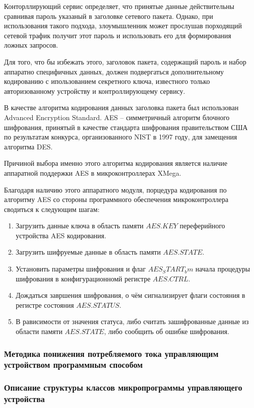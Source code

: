 Конторллирующий сервис определяет, что принятые данные действительны
сравнивая пароль указаный в заголовке сетевого пакета. Однако,
при использования такого подхода, злоумышленник может прослушав
порходящий сетевой трафик получит этот пароль и использовать его
для формирования ложных запросов.


Для того, что бы избежать этого, заголовок пакета, содержащий пароль
и набор аппаратно специфичных данных, должен подвергаться дополнительному
кодированию с ипользованием секретного ключа, известного только
авторизованному устройству и контроллирующему сервису.


В качестве алгоритма кодирования данных заголовка пакета был использован
Advanced Encryption Standard. AES -- симметричный алгоритм блочного
шифрования, принятый в качестве стандарта шифрования правительством США
по результатам конкурса, организованного NIST в 1997 году, для замещения
алгоритма DES.


Причиной выбора именно этого алгоритма кодирования является
наличие аппаратной поддержки AES в микроконтроллерах XMega.


Благодаря наличию этого аппаратного модуля, порцедура кодирования
по алгоритму AES со стороны программного обеспечения микроконтроллера
сводиться к следующим шагам:
\begin{enumerate}
    \item{} Загрузить данные ключа в область памяти $AES.KEY$
        переферийного устройства AES кодирования.
    \item{} Загрузить шифруемые данные в область памяти $AES.STATE$.
    \item{} Установить параметры шифрования и флаг $AES_START_bm$ начала
        процедуры шифрования в конфигурационномй регистре $AES.CTRL$.
    \item{} Дождаться завршения шифрования, о чём сигнализирует
        флаги состояния в регистре состояния $AES.STATUS$.
    \item{} В рависимости от значения статуса, либо считать зашифрованные
        данные из области памяти $AES.STATE$, либо сообщить об ошибке
        шифрования.
\end{enumerate}


\subsubsection{Методика понижения потребляемого тока управляющим устройством
программным способом}

\subsubsection{Описание структуры классов микропрограммы управляющего устройства}

